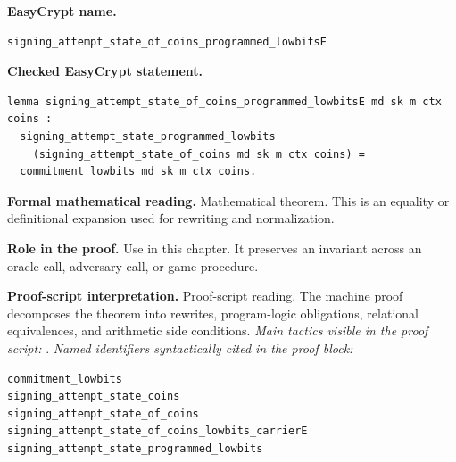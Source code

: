 \begin{formaltheorem}
\noindent\textbf{EasyCrypt name.}
\begin{lstlisting}[language=EasyCrypt,basicstyle=\ttfamily\scriptsize]
signing_attempt_state_of_coins_programmed_lowbitsE
\end{lstlisting}
\noindent\textbf{Checked EasyCrypt statement.}
\begin{lstlisting}[language=EasyCrypt,basicstyle=\ttfamily\scriptsize]
lemma signing_attempt_state_of_coins_programmed_lowbitsE md sk m ctx coins :
  signing_attempt_state_programmed_lowbits
    (signing_attempt_state_of_coins md sk m ctx coins) =
  commitment_lowbits md sk m ctx coins.
\end{lstlisting}
\noindent\textbf{Formal mathematical reading.}
Mathematical theorem. This is an equality or definitional expansion used for rewriting and normalization.

\noindent\textbf{Role in the proof.}
Use in this chapter. It preserves an invariant across an oracle call, adversary call, or game procedure.

\noindent\textbf{Proof-script interpretation.}
Proof-script reading. The machine proof decomposes the theorem into rewrites, program-logic obligations, relational equivalences, and arithmetic side conditions.
\emph{Main tactics visible in the proof script:} .
\emph{Named identifiers syntactically cited in the proof block:}
\begin{lstlisting}[language=EasyCrypt,basicstyle=\ttfamily\scriptsize]
commitment_lowbits
signing_attempt_state_coins
signing_attempt_state_of_coins
signing_attempt_state_of_coins_lowbits_carrierE
signing_attempt_state_programmed_lowbits
\end{lstlisting}

\end{formaltheorem}

